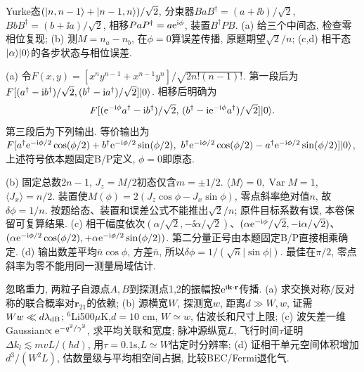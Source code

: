 \begin{exercise}Yurke态$(\lvert n,n-1\rangle+\lvert n-1,n\rangle)/\sqrt2$, 分束器$BaB^\dagger=(a+\ii b)/\sqrt2$, $BbB^\dagger=(b+\ii a)/\sqrt2$, 相移$PaP^\dagger=a\mathrm e^{\mathrm i\phi}$, 装置$B^\dagger PB$. (a) 给三个中间态, 检查零相位复现; (b) 测$M=n_a-n_b$, 在$\phi=0$算误差传播, 原题期望$\sqrt2/n$; (c,d) 相干态$\lvert \alpha\rangle\lvert 0\rangle$的各步状态与相位误差.\end{exercise}
\begin{solution}(a) 令$F(x,y)=[x^ny^{n-1}+x^{n-1}y^n]/\sqrt{2n!(n-1)!}$. 第一段后为$F[(a^\dagger-\mathrm i b^\dagger)/\sqrt2,(b^\dagger-\mathrm i a^\dagger)/\sqrt2]\lvert 0\rangle$. 相移后明确为
\[F[(\mathrm e^{-\mathrm i\phi}a^\dagger-\mathrm i b^\dagger)/\sqrt2,\,
 (b^\dagger-\mathrm i\mathrm e^{-\mathrm i\phi}a^\dagger)/\sqrt2]\lvert 0\rangle.\]
第三段后为下列输出. 等价输出为$F[a^\dagger\e^{-\ii\phi/2}\cos(\phi/2)+b^\dagger\e^{-\ii\phi/2}\sin(\phi/2),\ b^\dagger\e^{-\ii\phi/2}\cos(\phi/2)-a^\dagger\e^{-\ii\phi/2}\sin(\phi/2)]\ket0$, 上述符号依本题固定B/P定义, $\phi=0$即原态.

(b) 固定总数$2n-1$, $J_z=M/2$初态仅含$m=\pm1/2$. $\langle M\rangle=0,\operatorname{Var}M=1$, $\langle J_x\rangle=n/2$. 装置使$M(\phi)=2(J_z\cos\phi-J_x\sin\phi)$, 零点斜率绝对值$n$, 故$\delta\phi=1/n$. 按题给态、装置和误差公式不能推出$\sqrt2/n$; 原件目标系数有误, 本卷保留可复算结果. (c) 相干幅度依次$(\alpha/\sqrt2,-\ii\alpha/\sqrt2)$、$(\alpha\mathrm e^{-\mathrm i\phi}/\sqrt2,-\mathrm i\alpha/\sqrt2)$、$(\alpha\mathrm e^{-\mathrm i\phi/2}\cos(\phi/2),+\alpha\mathrm e^{-\mathrm i\phi/2}\sin(\phi/2))$. 第二分量正号由本题固定B/P直接相乘确定. (d) 输出数差平均$\bar n\cos\phi$, 方差$\bar n$, 所以$\delta\phi=1/(\sqrt{\bar n}|\sin\phi|)$. 最佳在$\pi/2$, 零点斜率为零不能用同一测量局域估计.
\end{solution}
\begin{exercise}忽略重力, 两粒子自源点$A,B$到探测点1,2的振幅按$\mathrm e^{\mathrm i\mathbf k\cdot\mathbf r}$传播. (a) 求交换对称/反对称的联合概率对$\mathbf r_{21}$的依赖; (b) 源横宽$W$, 探测宽$w$, 距离$d\gg W,w$, 证需$Ww\ll d\lambda_{\rm dB}$; $^6$Li500$\mu$K,$d=10$ cm, $W\simeq w$, 估波长和尺寸上限; (c) 波矢差一维Gaussian$\propto\mathrm e^{-q^2/\gamma^2}$, 求平均关联和宽度; 脉冲源纵宽$L$, 飞行时间$\tau$证明$\Delta k_l\lesssim mvL/(\hbar d)$, 用$\tau=0.1$s,$L\simeq W$估定时分辨率; (d) 证相干单元空间体积增加$d^3/(W^2L)$, 估数量级与平均相空间占据, 比较BEC/Fermi退化气.\end{exercise}
